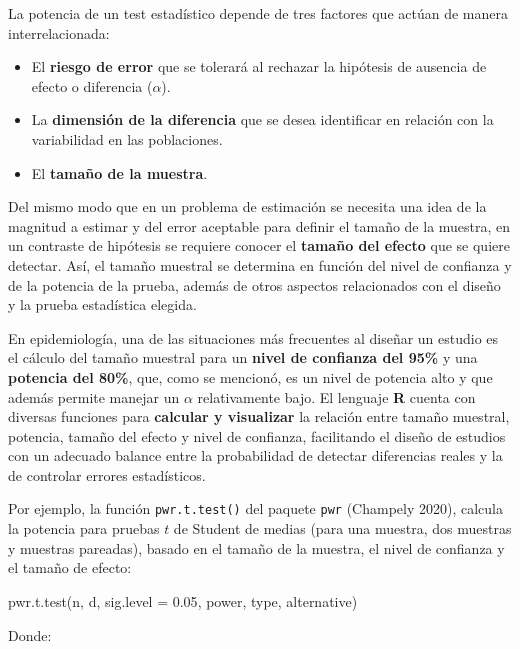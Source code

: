 \documentclass[
  spanish,
  a4paper,
]{scrbook}
\newenvironment{Shaded}{\begin{snugshade}}{\end{snugshade}}
\newcommand{\AttributeTok}[1]{\textcolor[rgb]{0.40,0.45,0.13}{#1}}
\newcommand{\FloatTok}[1]{\textcolor[rgb]{0.68,0.00,0.00}{#1}}
\newcommand{\FunctionTok}[1]{\textcolor[rgb]{0.28,0.35,0.67}{#1}}
\newcommand{\NormalTok}[1]{\textcolor[rgb]{0.00,0.23,0.31}{#1}}
\begin{document}
La potencia de un test estadístico depende de tres factores que actúan
de manera interrelacionada:

\begin{itemize}
\item
  El \textbf{riesgo de error} que se tolerará al rechazar la hipótesis
  de ausencia de efecto o diferencia (\(\alpha\)).
\item
  La \textbf{dimensión de la diferencia} que se desea identificar en
  relación con la variabilidad en las poblaciones.
\item
  El \textbf{tamaño de la muestra}.
\end{itemize}

Del mismo modo que en un problema de estimación se necesita una idea de
la magnitud a estimar y del error aceptable para definir el tamaño de la
muestra, en un contraste de hipótesis se requiere conocer el
\textbf{tamaño del efecto} que se quiere detectar. Así, el tamaño
muestral se determina en función del nivel de confianza y de la potencia
de la prueba, además de otros aspectos relacionados con el diseño y la
prueba estadística elegida.

En epidemiología, una de las situaciones más frecuentes al diseñar un
estudio es el cálculo del tamaño muestral para un \textbf{nivel de
confianza del 95\%} y una \textbf{potencia del 80\%}, que, como se
mencionó, es un nivel de potencia alto y que además permite manejar un
\(\alpha\) relativamente bajo. El lenguaje \textbf{R} cuenta con
diversas funciones para \textbf{calcular y visualizar} la relación entre
tamaño muestral, potencia, tamaño del efecto y nivel de confianza,
facilitando el diseño de estudios con un adecuado balance entre la
probabilidad de detectar diferencias reales y la de controlar errores
estadísticos.

Por ejemplo, la función \texttt{pwr.t.test()} del paquete \texttt{pwr}
(Champely 2020), calcula la potencia para pruebas \(t\) de Student de
medias (para una muestra, dos muestras y muestras pareadas), basado en
el tamaño de la muestra, el nivel de confianza y el tamaño de efecto:

\begin{Shaded}
\begin{Highlighting}[]
\FunctionTok{pwr.t.test}\NormalTok{(n, d, }\AttributeTok{sig.level =} \FloatTok{0.05}\NormalTok{, power, type, alternative)}
\end{Highlighting}
\end{Shaded}

Donde:
\end{document}
